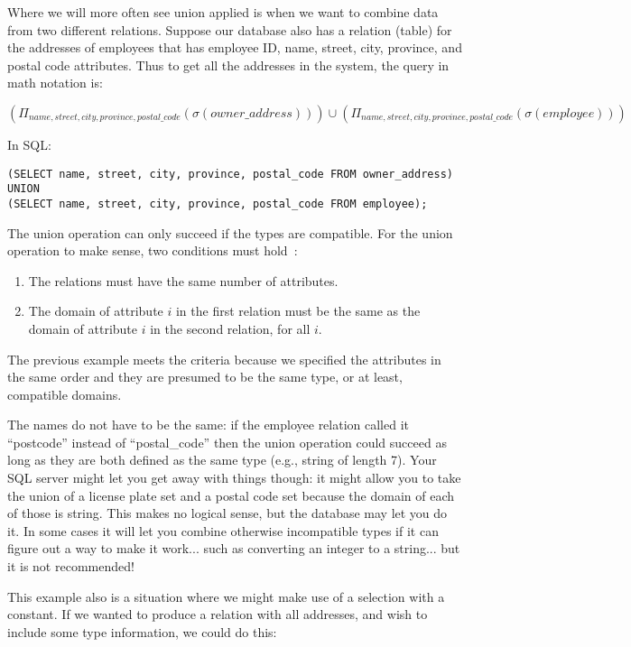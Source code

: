 \documentclass[a4paper]{report}
\begin{document}
Where we will more often see union applied is when we want to combine data from two different relations. Suppose our database also has a relation (table) for the addresses of employees that has employee ID, name, street, city, province, and postal code attributes. Thus to get all the addresses in the system, the query in math notation is:

$(\Pi_{name, street, city, province, postal\_code}(\sigma( owner\_address) )) \cup  (\Pi_{name, street, city, province, postal\_code}(\sigma( employee ) ))$

In SQL:

\texttt{(SELECT name, street, city, province, postal\_code FROM owner\_address)\\ 
UNION\\ 
(SELECT name, street, city, province, postal\_code FROM employee);}

The union operation can only succeed if the types are compatible. For the union operation to make sense, two conditions must hold~\cite{dsc}:

\begin{enumerate}
	\item The relations must have the same number of attributes.
	\item The domain of attribute $i$ in the first relation must be the same as the domain of attribute $i$ in the second relation, for all $i$. 
\end{enumerate}

The previous example meets the criteria because we specified the attributes in the same order and they are presumed to be the same type, or at least, compatible domains.

The names do not have to be the same: if the employee relation called it ``postcode'' instead of ``postal\_code'' then the union operation could succeed as long as they are both defined as the same type (e.g., string of length 7). Your SQL server might let you get away with things though: it might allow you to take the union of a license plate set and a postal code set because the domain of each of those is string. This makes no logical sense, but the database may let you do it. In some cases it will let you combine otherwise incompatible types if it can figure out a way to make it work... such as converting an integer to a string... but it is not recommended!

This example also is a situation where we might make use of a selection with a constant. If we wanted to produce a relation with all addresses, and wish to include some type information, we could do this:
\end{document}
